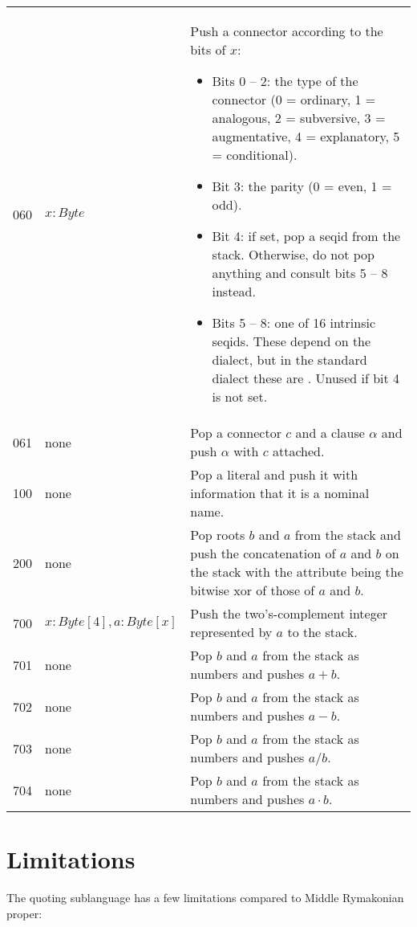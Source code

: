 \documentclass{book}
\newcommand{\lname}{Middle Rymakonian}
\begin{document}
\begin{longtabu}[c]{r|l|Y}
    060 & $x: Byte$ & Push a connector according to the bits of $x$:
    \begin{itemize}
        \item Bits 0 -- 2: the type of the connector (0 = ordinary, 1 = analogous, 2 = subversive, 3 = augmentative, 4 = explanatory, 5 = conditional).
        \item Bit 3: the parity (0 = even, 1 = odd).
        \item Bit 4: if set, pop a seqid from the stack. Otherwise, do not pop anything and consult bits 5 -- 8 instead.
        \item Bits 5 -- 8: one of 16 intrinsic seqids. These depend on the dialect, but in the standard dialect these are . Unused if bit 4 is not set.
    \end{itemize}
    \\
    061 & none & Pop a connector $c$ and a clause $\alpha$ and push $\alpha$ with $c$ attached. \\
    100 & none & Pop a literal and push it with information that it is a nominal name. \\
    200 & none & Pop roots $b$ and $a$ from the stack and push the concatenation of $a$ and $b$ on the stack with the attribute being the bitwise xor of those of $a$ and $b$. \\
    700 & $x: Byte[4], a: Byte[x]$ & Push the two's-complement integer represented by $a$ to the stack. \\
    701 & none & Pop $b$ and $a$ from the stack as numbers and pushes $a + b$. \\
    702 & none & Pop $b$ and $a$ from the stack as numbers and pushes $a - b$. \\
    703 & none & Pop $b$ and $a$ from the stack as numbers and pushes $a / b$. \\
    704 & none & Pop $b$ and $a$ from the stack as numbers and pushes $a \cdot b$. \\
\end{longtabu}

\section{Limitations}

The quoting sublanguage has a few limitations compared to \lname{} proper:
\end{document}
